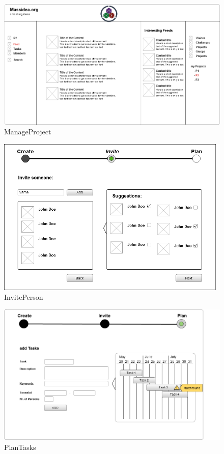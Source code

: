 \documentclass[a4paper,oneside,titlepage]{article}
\begin{document}
\begin{figure}[h]
    \includegraphics[width=\textwidth]{"Wireframe ManageProject"}
  \caption{ManageProject}
  \label{wireframe-manageproject}
\end{figure}

\begin{figure}[h]
    \includegraphics[width=\textwidth]{"Wireframe InvitePerson"}
  \caption{InvitePerson}
  \label{wireframe-InvitePerson}
\end{figure}

\begin{figure}[h]
    \includegraphics[width=\textwidth]{"Wireframe PlanTasks"}
  \caption{PlanTasks}
  \label{wireframe-PlanTasks}
\end{figure}
\end{document}
